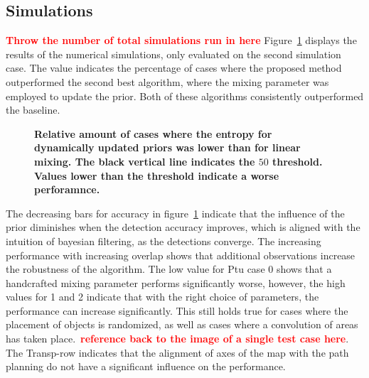 \documentclass[twocolumn,letterpaper]{IEEEAerospaceCLS}  %
\newcommand\todo[1]{\textbf{\textcolor{red}{#1}}}
\begin{document}
\subsection{Simulations} \label{ssec:ResSim}
\todo{Throw the number of total simulations run in here}
Figure~\ref{fig:Res} displays the results of the numerical simulations, only evaluated on the second simulation case. The value indicates the percentage of cases where the proposed method outperformed the second best algorithm, where the mixing parameter was employed to update the prior. Both of these algorithms consistently outperformed the baseline.  
\begin{figure}
    \centering
    \caption{\bf{
        Relative amount of cases where the entropy for dynamically updated priors was lower than for linear mixing. The black vertical line indicates the $50$ threshold. Values lower than the threshold indicate a worse perforamnce.
    }}
    \label{fig:Res}
\end{figure}
The decreasing bars for accuracy in figure~\ref{fig:Res} indicate that the influence of the prior diminishes when the detection accuracy improves, which is aligned with the intuition of bayesian filtering, as the detections converge. The increasing performance with increasing overlap shows that additional observations increase the robustness of the algorithm. The low value for Ptu case 0 shows that a handcrafted mixing parameter performs significantly worse, however, the high values for 1 and 2 indicate that with the right choice of parameters, the performance can increase significantly. This still holds true for cases where the placement of objects is randomized, as well as cases where a convolution of areas has taken place.~\todo{reference back to the image of a single test case here}. The Transp-row indicates that the alignment of axes of the map with the path planning do not have a significant influence on the performance.
\end{document}
